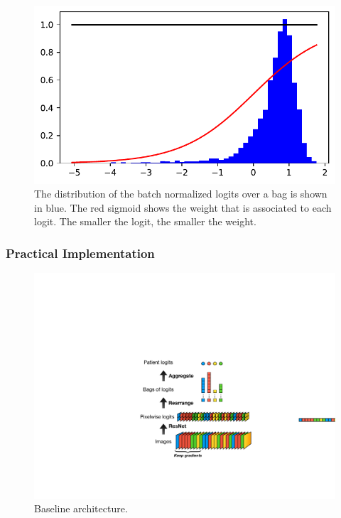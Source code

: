 \documentclass[final]{cvpr}
\begin{document}
	\begin{figure}[h!]
		\begin{center}
			\includegraphics[width=0.95\linewidth]{fig/aggreg_2.pdf}
		\end{center}
		\caption{The distribution of the batch normalized logits over a bag is shown in blue. The red sigmoid shows the weight that is associated to each logit. The smaller the logit, the smaller the weight.}
		\label{fig:aggreg}
	\end{figure}
	
	\subsubsection{Practical Implementation}
	
	\begin{figure}[h!]
		\begin{center}
			\includegraphics[width=0.9\linewidth]{fig/graphic3.pdf}
		\end{center}
		\caption{Baseline architecture.}
		\label{fig:overview}
	\end{figure}
	
\end{document}
